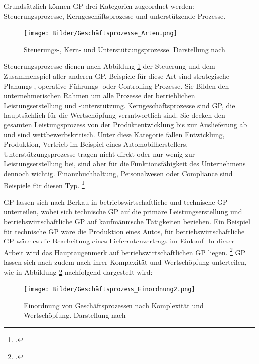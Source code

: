 Grundsätzlich können GP drei Kategorien zugeordnet werden: Steuerungsprozesse, Kerngeschäftsprozesse und unterstützende Prozesse.

\begin{figure}[H]
    \centering
    \texttt{[image: Bilder/Geschäftsprozesse\_Arten.png]}
    \caption[Steuerungs-, Kern- und Unterstützungsprozesse]{Steuerungs-, Kern- und Unterstützungsprozesse. Darstellung nach \cite[][S. 44]{theorie_gadatsch_grundkurs_geschäftsprozessmanagement_2010}}
    \label{fig:Geschäftsprozesse_Arten}
\end{figure}

Steuerungsprozesse dienen nach Abbildung \ref{fig:Geschäftsprozesse_Arten} der Steuerung und dem Zusammenspiel aller anderen GP. Beispiele für diese Art sind strategische Planungs-, operative Führungs- oder Controlling-Prozesse. Sie Bilden den unternehmerischen Rahmen um alle Prozesse der betrieblichen Leistungserstellung und -unterstützung. Kerngeschäftsprozesse sind GP, die hauptsächlich für die Wertschöpfung verantwortlich sind. Sie decken den gesamten Leistungsprozess von der Produktentwicklung bis zur Auslieferung ab und sind wettbewerbskritisch. Unter diese Kategorie fallen \zB Entwicklung, Produktion, Vertrieb im Beispiel eines Automobilherstellers. Unterstützungsprozesse tragen nicht direkt oder nur wenig zur Leistungserstellung bei, sind aber für die Funktionsfähigkeit des Unternehmens dennoch wichtig. Finanzbuchhaltung, Personalwesen oder Compliance sind Beispiele für diesen Typ. \footcite[Vgl.][S. 44]{theorie_gadatsch_grundkurs_geschäftsprozessmanagement_2010}

GP lassen sich nach Berkau in betriebswirtschaftliche und technische GP unterteilen, wobei sich technische GP auf die primäre Leistungserstellung und betriebswirtschaftliche GP auf kaufmännische Tätigkeiten beziehen. \parencite[Vgl.][S. 27]{theorie_berkau_arten_geschäftsprozesse_1998} Ein Beispiel für technische GP wäre die Produktion eines Autos, für betriebswirtschaftliche GP wäre es die Bearbeitung eines Lieferantenvertrags im Einkauf. In dieser Arbeit wird das Hauptaugenmerk auf betriebswirtschaftlichen GP liegen. \footcite[Vgl.][S. 10]{theorie_staud_geschäftsprozessanalyse_2006} GP lassen sich nach zudem nach ihrer Komplexität und Wertschöpfung unterteilen, wie in Abbildung \ref{fig:Geschäftsprozess_Einordnung2} nachfolgend dargestellt wird:

\begin{figure}[H]
    \centering
    \texttt{[image: Bilder/Geschäftsprozess\_Einordnung2.png]}
    \caption[Einordnung von Geschäftsprozessen nach Komplexität und Wertschöpfung]{Einordnung von Geschäftsprozessen nach Komplexität und Wertschöpfung. Darstellung nach \cite{theorie_riekhof_geschäftsprozess_einordnung_1997}}
    \label{fig:Geschäftsprozess_Einordnung2}
\end{figure}

